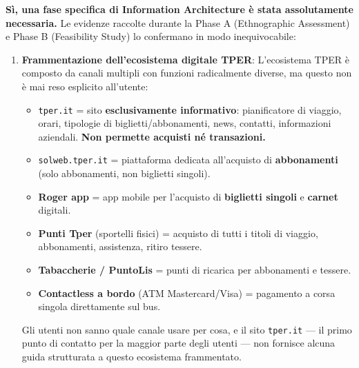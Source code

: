 \begin{tcolorbox}[colback=backgroundColor,colframe=borderColor,arc=2mm]
{\small
\textbf{Sì, una fase specifica di Information Architecture è stata assolutamente necessaria.} Le evidenze raccolte durante la Phase A (Ethnographic Assessment) e Phase B (Feasibility Study) lo confermano in modo inequivocabile:

\begin{enumerate}[leftmargin=*]
 \item \textbf{Frammentazione dell'ecosistema digitale TPER}: L'ecosistema TPER è composto da canali multipli con funzioni radicalmente diverse, ma questo non è mai reso esplicito all'utente:
 \begin{itemize}
   \item \texttt{tper.it} = sito \textbf{esclusivamente informativo}: pianificatore di viaggio, orari, tipologie di biglietti/abbonamenti, news, contatti, informazioni aziendali. \textbf{Non permette acquisti né transazioni.}
   \item \texttt{solweb.tper.it} = piattaforma dedicata all'acquisto di \textbf{abbonamenti} (solo abbonamenti, non biglietti singoli).
   \item \textbf{Roger app} = app mobile per l'acquisto di \textbf{biglietti singoli} e \textbf{carnet} digitali.
   \item \textbf{Punti Tper} (sportelli fisici) = acquisto di tutti i titoli di viaggio, abbonamenti, assistenza, ritiro tessere.
   \item \textbf{Tabaccherie / PuntoLis} = punti di ricarica per abbonamenti e tessere.
   \item \textbf{Contactless a bordo} (ATM Mastercard/Visa) = pagamento a corsa singola direttamente sul bus.
 \end{itemize}
 Gli utenti non sanno quale canale usare per cosa, e il sito \texttt{tper.it} --- il primo punto di contatto per la maggior parte degli utenti --- non fornisce alcuna guida strutturata a questo ecosistema frammentato.


\end{enumerate}}
\end{tcolorbox}
